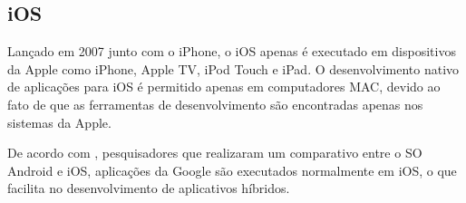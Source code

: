
\subsection{iOS}

Lançado em 2007 junto com o iPhone, o iOS apenas é executado em dispositivos da Apple como iPhone, Apple TV, iPod Touch e iPad. O desenvolvimento nativo de aplicações para iOS é permitido apenas em computadores MAC, devido ao fato de que as ferramentas de desenvolvimento são encontradas apenas nos sistemas da Apple.\cite{garbin2014sistema}

De acordo com , pesquisadores que realizaram um comparativo entre o SO Android e iOS, aplicações da Google são executados normalmente em iOS, o que facilita no desenvolvimento de aplicativos híbridos.

